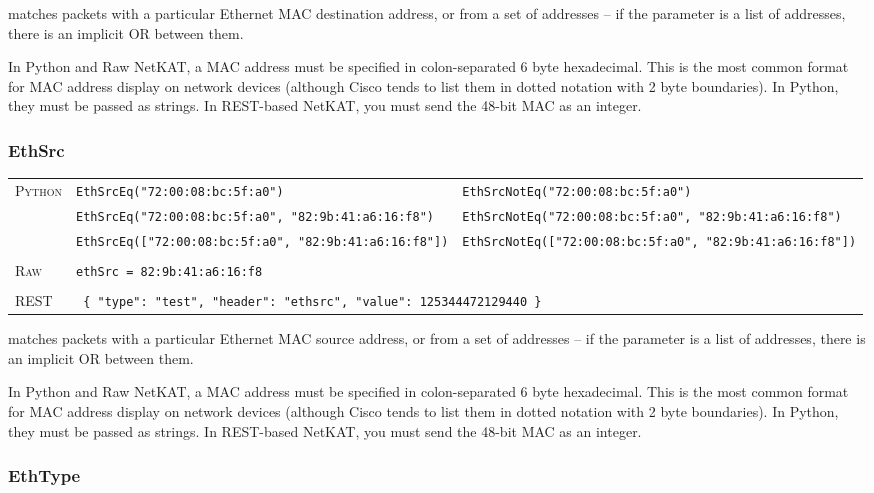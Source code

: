  matches packets with a particular Ethernet MAC destination address, or from a set of addresses -- 
if the 
parameter is a list of addresses, there is an implicit OR between them.    

In Python and Raw NetKAT, a MAC address must be specified in colon-separated 6 byte hexadecimal.  This is the most common format
for MAC address display on network devices (although Cisco tends to list them in dotted notation with 2 byte
boundaries).  In Python, they must be passed as strings.  In REST-based NetKAT, you must send the 48-bit MAC as 
an integer.  

\subsubsection{EthSrc}

\bigskip
\begin{tabularx}{\linewidth}{lXX}
\textsc{Python}   & \texttt{EthSrcEq("72:00:08:bc:5f:a0")}    & \texttt{EthSrcNotEq("72:00:08:bc:5f:a0")} \\
    & \texttt{EthSrcEq("72:00:08:bc:5f:a0", "82:9b:41:a6:16:f8")}  & \texttt{EthSrcNotEq("72:00:08:bc:5f:a0", "82:9b:41:a6:16:f8")} \\
    & \texttt{EthSrcEq(["72:00:08:bc:5f:a0", "82:9b:41:a6:16:f8"])}  & \texttt{EthSrcNotEq(["72:00:08:bc:5f:a0", "82:9b:41:a6:16:f8"])} \\ \\
\textsc{Raw}    & \texttt{ethSrc = 82:9b:41:a6:16:f8}     & \\ \\
\textsc{REST} & \multicolumn{2}{l}{\texttt{ \{ "type": "test", "header": "ethsrc", "value": 125344472129440 \} }} 
\end{tabularx}

 matches packets with a particular Ethernet MAC source address, or from a set of addresses -- 
if the 
parameter is a list of addresses, there is an implicit OR between them.    

In Python and Raw NetKAT, a MAC address must be specified in colon-separated 6 byte hexadecimal.  This is the most common format
for MAC address display on network devices (although Cisco tends to list them in dotted notation with 2 byte
boundaries).  In Python, they must be passed as strings.  In REST-based NetKAT, you must send the 48-bit MAC as 
an integer.  

\subsubsection{EthType}

